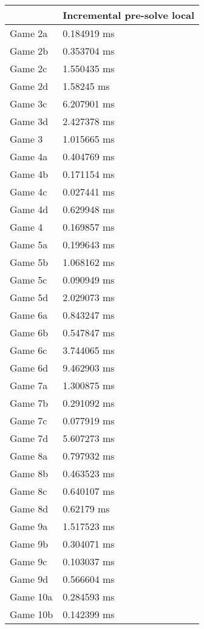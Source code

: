 \begin{multicols}{2}
\begin{tabular}{|l|l|}
	\hline
	& Incremental pre-solve local \\ \hline
	Game 2a & 0.184919 ms \\ \hline
	Game 2b & 0.353704 ms \\ \hline
	Game 2c & 1.550435 ms \\ \hline
	Game 2d & 1.58245 ms \\ \hline
	Game 3c & 6.207901 ms \\ \hline
	Game 3d & 2.427378 ms \\ \hline
	Game 3 & 1.015665 ms \\ \hline
	Game 4a & 0.404769 ms \\ \hline
	Game 4b & 0.171154 ms \\ \hline
	Game 4c & 0.027441 ms \\ \hline
	Game 4d & 0.629948 ms \\ \hline
	Game 4 & 0.169857 ms \\ \hline
	Game 5a & 0.199643 ms \\ \hline
	Game 5b & 1.068162 ms \\ \hline
	Game 5c & 0.090949 ms \\ \hline
	Game 5d & 2.029073 ms \\ \hline
	Game 6a & 0.843247 ms \\ \hline
	Game 6b & 0.547847 ms \\ \hline
	Game 6c & 3.744065 ms \\ \hline
	Game 6d & 9.462903 ms \\ \hline
	Game 7a & 1.300875 ms \\ \hline
	Game 7b & 0.291092 ms \\ \hline
	Game 7c & 0.077919 ms \\ \hline
	Game 7d & 5.607273 ms \\ \hline
	Game 8a & 0.797932 ms \\ \hline
	Game 8b & 0.463523 ms \\ \hline
	Game 8c & 0.640107 ms \\ \hline
	Game 8d & 0.62179 ms \\ \hline
	Game 9a & 1.517523 ms \\ \hline
	Game 9b & 0.304071 ms \\ \hline
	Game 9c & 0.103037 ms \\ \hline
	Game 9d & 0.566604 ms \\ \hline
	Game 10a & 0.284593 ms \\ \hline
	Game 10b & 0.142399 ms \\ \hline

\end{tabular}
\end{multicols}
